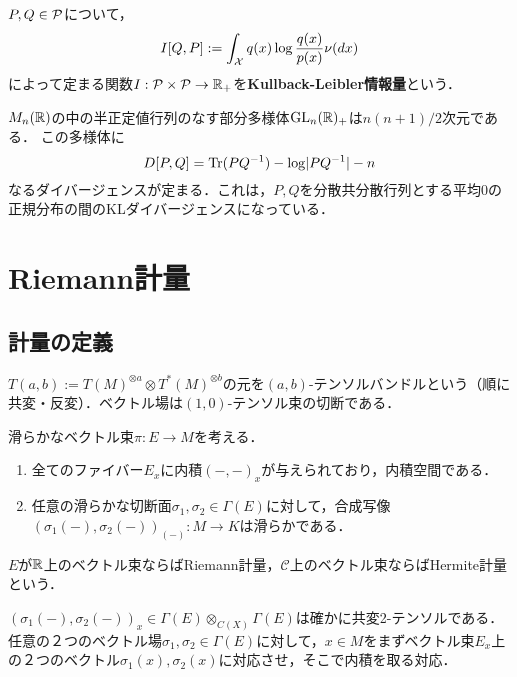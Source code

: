 \documentclass[uplatex,dvipdfmx]{jsreport}
\renewcommand{\C}{\mathcal{C}}
\begin{document}
\begin{definition}
    $P,Q\in\P$について，
    \[I[Q,P]:=\int_\X q(x)\log\frac{q(x)}{p(x)}\nu(dx)\]
    によって定まる関数$I:\P\times\P\to\R_+$を\textbf{Kullback-Leibler情報量}という．
\end{definition}

\begin{example}[正規分布族のKL分離度]
    $M_n(\R)$の中の半正定値行列のなす部分多様体$\GL_n(\R)_+$は$n(n+1)/2$次元である．
    この多様体に
    \[D[P,Q]=\Tr(PQ^{-1})-\log\abs{PQ^{-1}}-n\]
    なるダイバージェンスが定まる．これは，$P,Q$を分散共分散行列とする平均$0$の正規分布の間のKLダイバージェンスになっている．
\end{example}

\section{Riemann計量}

\subsection{計量の定義}

\begin{tcolorbox}[colframe=ForestGreen, colback=ForestGreen!10!white,breakable,colbacktitle=ForestGreen!40!white,coltitle=black,fonttitle=\bfseries\sffamily,
    title=]
    $T(a,b):=T(M)^{\otimes a}\otimes T^*(M)^{\otimes b}$の元を$(a,b)$-テンソルバンドルという（順に共変・反変）．ベクトル場は$(1,0)$-テンソル束の切断である．
\end{tcolorbox}

\begin{definition}[metric]\label{def-metric}
    滑らかなベクトル束$\pi:E\to M$を考える．
    \begin{enumerate}
        \item 全てのファイバー$E_x$に内積$(-,-)_x$が与えられており，内積空間である．
        \item 任意の滑らかな切断面$\sigma_1,\sigma_2\in\Gamma(E)$に対して，合成写像$(\sigma_1(-),\sigma_2(-))_{(-)}:M\to K$は滑らかである．
    \end{enumerate}
    $E$が$\R$上のベクトル束ならばRiemann計量，$\C$上のベクトル束ならばHermite計量という．
\end{definition}
\begin{remarks}
    $(\sigma_1(-),\sigma_2(-))_x\in\Gamma(E)\otimes_{C(X)}\Gamma(E)$は確かに共変2-テンソルである．
    任意の２つのベクトル場$\sigma_1,\sigma_2\in\Gamma(E)$に対して，$x\in M$をまずベクトル束$E_x$上の２つのベクトル$\sigma_1(x),\sigma_2(x)$に対応させ，そこで内積を取る対応．
\end{remarks}
\end{document}

